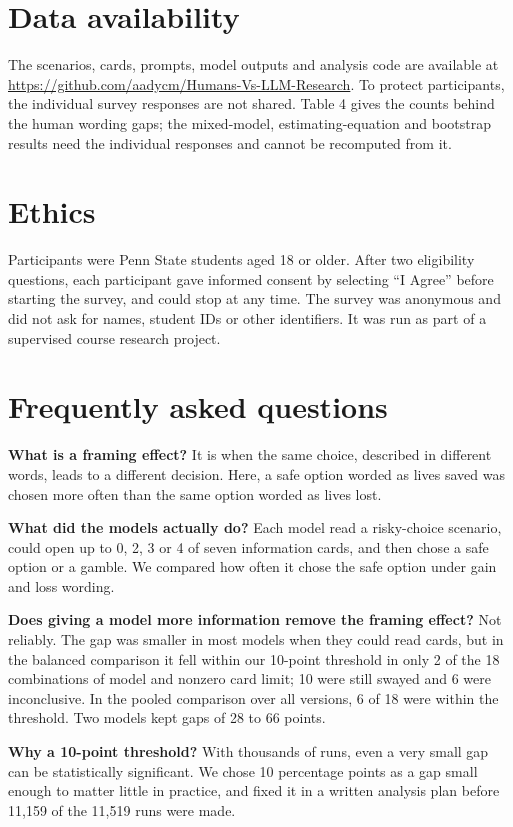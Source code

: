 \documentclass[11pt]{article}
\begin{document}
\section*{Data availability}

The scenarios, cards, prompts, model outputs and analysis code are available at \url{https://github.com/aadycm/Humans-Vs-LLM-Research}. To protect participants, the individual survey responses are not shared. Table 4 gives the counts behind the human wording gaps; the mixed-model, estimating-equation and bootstrap results need the individual responses and cannot be recomputed from it.

\section*{Ethics}

Participants were Penn State students aged 18 or older. After two eligibility questions, each participant gave informed consent by selecting ``I Agree'' before starting the survey, and could stop at any time. The survey was anonymous and did not ask for names, student IDs or other identifiers. It was run as part of a supervised course research project.

\section*{Frequently asked questions}

\textbf{What is a framing effect?} It is when the same choice, described in different words, leads to a different decision. Here, a safe option worded as lives saved was chosen more often than the same option worded as lives lost.

\textbf{What did the models actually do?} Each model read a risky-choice scenario, could open up to 0, 2, 3 or 4 of seven information cards, and then chose a safe option or a gamble. We compared how often it chose the safe option under gain and loss wording.

\textbf{Does giving a model more information remove the framing effect?} Not reliably. The gap was smaller in most models when they could read cards, but in the balanced comparison it fell within our 10-point threshold in only 2 of the 18 combinations of model and nonzero card limit; 10 were still swayed and 6 were inconclusive. In the pooled comparison over all versions, 6 of 18 were within the threshold. Two models kept gaps of 28 to 66 points.

\textbf{Why a 10-point threshold?} With thousands of runs, even a very small gap can be statistically significant. We chose 10 percentage points as a gap small enough to matter little in practice, and fixed it in a written analysis plan before 11,159 of the 11,519 runs were made.
\end{document}
